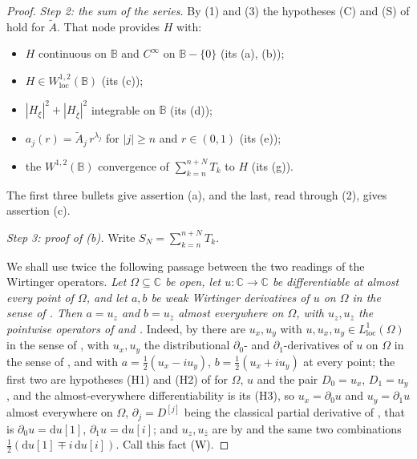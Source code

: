 \begin{proof}
\emph{Step 2: the sum of the series.}  By (1) and (3) the hypotheses (C) and
(S) of  hold for $\widetilde{A}$.  That node
provides $H$ with:
\begin{itemize}
\item $H$ continuous on $\mathbb{B}$ and $C^\infty$ on $\mathbb{B}-\{0\}$
  (its (a), (b));
\item $H\in W^{1,2}_{\mathrm{loc}}(\mathbb{B})$ (its (c));
\item $|H_\xi|^2+|H_{\bar\xi}|^2$ integrable on $\mathbb{B}$ (its (d));
\item $a_j(r)=\widetilde{A}_j\,r^{\lambda_j}$ for $|j|\ge n$ and $r\in(0,1)$
  (its (e));
\item the $W^{1,2}(\mathbb{B})$ convergence of $\sum_{k=n}^{n+N}T_k$ to $H$
  (its (g)).
\end{itemize}
The first three bullets give assertion (a), and the last, read through (2),
gives assertion (c).

\emph{Step 3: proof of (b).}  Write $S_N=\sum_{k=n}^{n+N}T_k$.

We shall use twice the following passage between the two readings of the
Wirtinger operators.  \emph{Let $\Omega\subseteq\mathbb{C}$ be open, let
$u\colon\mathbb{C}\to\mathbb{C}$ be differentiable at almost every point of
$\Omega$, and let $a,b$ be weak Wirtinger derivatives of $u$ on $\Omega$ in
the sense of .  Then $a=u_z$ and $b=u_{\bar z}$
almost everywhere on $\Omega$, with $u_z,u_{\bar z}$ the pointwise operators
of  and .}  Indeed, by 
there are $u_x,u_y$ with $u,u_x,u_y\in L^1_{\mathrm{loc}}(\Omega)$ in the sense
of , with $u_x,u_y$ the distributional $\partial_0$- and
$\partial_1$-derivatives of $u$ on $\Omega$ in the sense of
, and with $a=\tfrac12(u_x-iu_y)$,
$b=\tfrac12(u_x+iu_y)$ at every point; the first two are hypotheses (H1) and
(H2) of  for $\Omega$, $u$ and the pair
$D_0=u_x$, $D_1=u_y$, and the almost-everywhere differentiability is its (H3),
so $u_x=\partial_0u$ and $u_y=\partial_1u$ almost everywhere on $\Omega$,
$\partial_j=D^{[j]}$ being the classical partial derivative of
, that is $\partial_0u=\mathrm{d}u[1]$,
$\partial_1u=\mathrm{d}u[i]$; and $u_z,u_{\bar z}$ are by  and
 the same two combinations
$\tfrac12(\mathrm{d}u[1]\mp i\,\mathrm{d}u[i])$.  Call this fact (W).


\end{proof}
